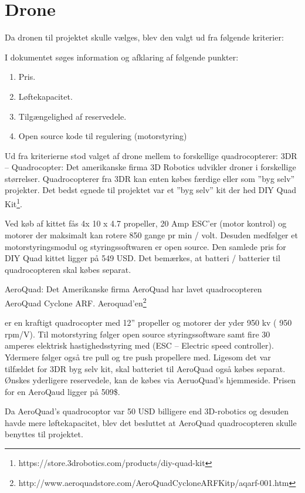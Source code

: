 \section{Drone}

Da dronen til projektet skulle vælges, blev den valgt ud fra følgende kriterier:

I dokumentet søges information og afklaring af følgende punkter:
\begin{enumerate}[label*=\arabic*.]
	\item Pris.
	\item Løftekapacitet. 
	\item Tilgængelighed af reservedele. 
	\item Open source kode til regulering (motorstyring)
\end{enumerate}

\vspace{1cm}

Ud fra kriterierne stod valget af drone mellem to forskellige quadrocopterer: 
3DR – Quadrocopter:  Det amerikanske firma 3D Robotics udvikler droner i forskellige størrelser. Quadrocopterer fra 3DR kan enten købes færdige eller som ”byg selv” projekter. Det bedst egnede til projektet var et ”byg selv” kit der hed DIY Quad Kit\footnote{https://store.3drobotics.com/products/diy-quad-kit}. 

Ved køb af kittet fås 4x 10 x 4.7 propeller, 20 Amp ESC’er (motor kontrol) og motorer der maksimalt kan rotere 850 gange pr min / volt.  Desuden medfølger et motorstyringsmodul og styringssoftwaren er open source. Den samlede pris for DIY Quad kittet ligger på 549 USD. Det bemærkes, at batteri / batterier til quadrocopteren skal købes separat.

AeroQuad: Det Amerikanske firma AeroQuad har lavet quadrocopteren AeroQuad Cyclone ARF. Aeroquad'en\footnote{http://www.aeroquadstore.com/AeroQuad\textunderscore Cyclone\textunderscore ARF\textunderscore Kit\textunderscore p/aqarf-001.htm}  

er en kraftigt quadrocopter med 12” propeller og motorer der yder 950 kv ( 950 rpm/V). Til motorstyring følger open source styringssoftware samt fire 30 amperes elektrisk hastighedsstyring med (ESC – Electric speed controller). Ydermere følger også tre pull og tre push propellere med. Ligesom det var tilfældet for 3DR byg selv kit, skal batteriet til AeroQuad også købes separat. Ønskes yderligere reservedele, kan de købes via AeruoQuad’s hjemmeside. Prisen for en AeroQaud ligger på 509\$.

Da AeroQuad’s quadrocoptor var 50 USD billigere end 3D-robotics og desuden havde mere løftekapacitet, blev det besluttet at AeroQuad quadrocopteren skulle benyttes til projektet. 

